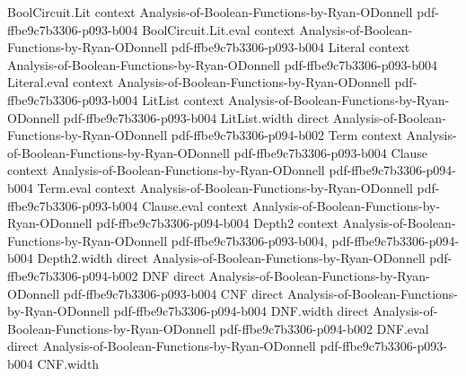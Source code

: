 \begin{theorem}
\leanok
{}
\proofstep
  {BoolCircuit.Lit}
  {context}
  {Analysis-of-Boolean-Functions-by-Ryan-ODonnell}
  {pdf-ffbe9c7b3306-p093-b004}
\proofstep
  {BoolCircuit.Lit.eval}
  {context}
  {Analysis-of-Boolean-Functions-by-Ryan-ODonnell}
  {pdf-ffbe9c7b3306-p093-b004}
\proofstep
  {Literal}
  {context}
  {Analysis-of-Boolean-Functions-by-Ryan-ODonnell}
  {pdf-ffbe9c7b3306-p093-b004}
\proofstep
  {Literal.eval}
  {context}
  {Analysis-of-Boolean-Functions-by-Ryan-ODonnell}
  {pdf-ffbe9c7b3306-p093-b004}
\proofstep
  {LitList}
  {context}
  {Analysis-of-Boolean-Functions-by-Ryan-ODonnell}
  {pdf-ffbe9c7b3306-p093-b004}
\proofstep
  {LitList.width}
  {direct}
  {Analysis-of-Boolean-Functions-by-Ryan-ODonnell}
  {pdf-ffbe9c7b3306-p094-b002}
\proofstep
  {Term}
  {context}
  {Analysis-of-Boolean-Functions-by-Ryan-ODonnell}
  {pdf-ffbe9c7b3306-p093-b004}
\proofstep
  {Clause}
  {context}
  {Analysis-of-Boolean-Functions-by-Ryan-ODonnell}
  {pdf-ffbe9c7b3306-p094-b004}
\proofstep
  {Term.eval}
  {context}
  {Analysis-of-Boolean-Functions-by-Ryan-ODonnell}
  {pdf-ffbe9c7b3306-p093-b004}
\proofstep
  {Clause.eval}
  {context}
  {Analysis-of-Boolean-Functions-by-Ryan-ODonnell}
  {pdf-ffbe9c7b3306-p094-b004}
\proofstep
  {Depth2}
  {context}
  {Analysis-of-Boolean-Functions-by-Ryan-ODonnell}
  {pdf-ffbe9c7b3306-p093-b004,
    pdf-ffbe9c7b3306-p094-b004}
\proofstep
  {Depth2.width}
  {direct}
  {Analysis-of-Boolean-Functions-by-Ryan-ODonnell}
  {pdf-ffbe9c7b3306-p094-b002}
\proofstep
  {DNF}
  {direct}
  {Analysis-of-Boolean-Functions-by-Ryan-ODonnell}
  {pdf-ffbe9c7b3306-p093-b004}
\proofstep
  {CNF}
  {direct}
  {Analysis-of-Boolean-Functions-by-Ryan-ODonnell}
  {pdf-ffbe9c7b3306-p094-b004}
\proofstep
  {DNF.width}
  {direct}
  {Analysis-of-Boolean-Functions-by-Ryan-ODonnell}
  {pdf-ffbe9c7b3306-p094-b002}
\proofstep
  {DNF.eval}
  {direct}
  {Analysis-of-Boolean-Functions-by-Ryan-ODonnell}
  {pdf-ffbe9c7b3306-p093-b004}
\proofstep
  {CNF.width}

\end{theorem}
